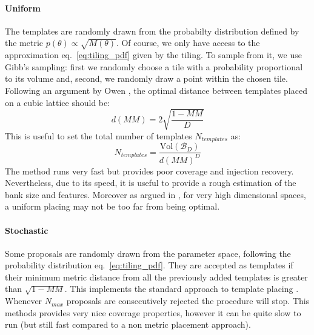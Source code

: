 \documentclass[twocolumn,showpacs,preprintnumbers,nofootinbib,prd,
superscriptaddress,10pt]{revtex4-2}
\newcommand{\stefano}[1]{{\textcolor{blue}{\texttt{SS: #1}} }}
\begin{document}
\paragraph{Uniform}\label{par:uniform}
The templates are randomly drawn from the probabilty distribution defined by the metric $p(\theta) \propto \sqrt{M(\theta)}$.
Of course, we only have access to the approximation eq.~\eqref{eq:tiling_pdf} given by the tiling. To sample from it, we use Gibb's sampling: first we randomly choose a tile with a probability proportional to its volume and, second, we randomly draw a point within the chosen tile.
\\
Following an argument by Owen \cite{owen_metric}, the optimal distance between templates placed on a cubic lattice should be:
\begin{equation}
	d(MM) = 2 \sqrt{\frac{1-MM}{D}}
\end{equation}
This is useful to set the total number of templates $N_{templates}$ as:
\begin{equation} \label{eq:N_templates}
	N_{templates} = \frac{\text{Vol}(\mathcal{B}_D)}{d(MM)^D}
\end{equation}
The method runs very fast but provides poor coverage and injection recovery. Nevertheless, due to its speed, it is useful to provide a rough estimation of the bank size and features.
Moreover as argued in \cite{Allen_performance_templates}, for very high dimensional spaces, a uniform placing may not be too far from being optimal.

\paragraph{Stochastic}\label{par:stochastic}
Some proposals are randomly drawn from the parameter space, following the probability distribution eq.~\eqref{eq:tiling_pdf}. They are accepted as templates if their minimum metric distance from all the previously added templates is greater than  $\sqrt{1-MM}$.
This implements the standard approach to template placing \cite{}.
Whenever $N_{max}$ proposals are consecutively rejected the procedure will stop.
This methods provides very nice coverage properties, however it can be quite slow to run (but still fast compared to a non metric placement approach).
\end{document}
